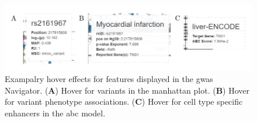     \begin{figure}[h!]
    \capstart
        \centering
        \includegraphics{Abbildung/GWAS_navigator_hover.pdf}

        \begin{minipage}{\captionwidth}
            \caption[database]{\newline
            Exampalry hover effects for features displayed in the \ac{gwas} Navigator. (\textbf{A}) Hover for variants in the manhattan plot. (\textbf{B}) Hover for variant phenotype associations. (\textbf{C}) Hover for cell type specific enhancers in the \ac{abc} model.}
            \label{fig:GWAS_navigator_hover}
        \end{minipage}
    \end{figure}

